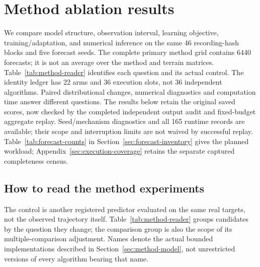 \documentclass[11pt]{article}
\begin{document}
\section{Method ablation results}
\label{sec:method-results}
We compare model structure, observation interval, learning objective,
training/adaptation, and numerical inference on the same 46 recording-hash
blocks and five forecast seeds. The complete primary method grid contains
6440 forecasts; it is not an average over the method and terrain matrices.
Table~\ref{tab:method-reader} identifies each question and its actual control.
The identity ledger has 22 arms and 36 execution slots, not 36 independent algorithms.
Paired distributional changes, numerical diagnostics and computation time
answer different questions. The results below retain the original saved scores,
now checked by the completed independent output audit and fixed-budget aggregate
replay. Seed/mechanism diagnostics and all 165 runtime records are available;
their scope and interruption limits are not waived by successful replay.
Table~\ref{tab:forecast-counts} in Section~\ref{sec:forecast-inventory}
gives the planned workload; Appendix~\ref{sec:execution-coverage} retains
the separate captured completeness census.

\subsection{How to read the method experiments}
\label{sec:method-reader}
The control is another registered predictor evaluated on the same real
targets, not the observed trajectory itself. Table~\ref{tab:method-reader}
groups candidates by the question they change; the comparison group is also
the scope of its multiple-comparison adjustment. Names denote the actual
bounded implementations described in Section~\ref{sec:method-model}, not
unrestricted versions of every algorithm bearing that name.
\end{document}
